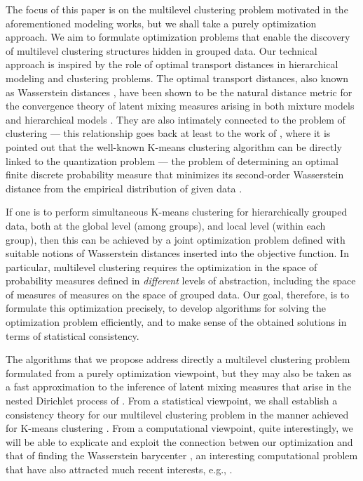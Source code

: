 The focus of this paper is on the multilevel clustering problem motivated in the aforementioned
modeling works, but we shall take a purely optimization approach. 
We aim to formulate optimization problems that enable the discovery of multilevel clustering 
structures hidden in grouped data. Our technical approach is
inspired by the role of optimal transport distances in hierarchical modeling and clustering problems.
The optimal transport distances, also known as Wasserstein distances \citep{Villani-03},
have been shown to be the natural distance metric for the convergence theory of latent
mixing measures arising in both mixture models \citep{Nguyen-13} and hierarchical models \citep{Nguyen-2016}.
They are also intimately connected to the problem of clustering --- this relationship goes
back at least to the work of \citep{Pollard-1982}, where it is pointed out that the well-known 
K-means clustering algorithm can be directly linked to the quantization problem --- the problem
of determining an optimal finite discrete probability measure that minimizes its 
second-order Wasserstein distance from the empirical distribution of given data \citep{Graf-2000}.

If one is to perform simultaneous K-means clustering for hierarchically grouped data, both at the global
level (among groups), and local level (within each group), then this can be achieved by a joint optimization
problem defined with suitable notions of Wasserstein distances inserted into the objective
function. In particular, multilevel clustering requires the optimization in the space of
probability measures defined in \emph{different} levels of abstraction, including the space of
measures of measures on the space of grouped data.
Our goal, therefore, is to formulate this optimization precisely, to develop algorithms
for solving the optimization problem efficiently, and to make sense of the obtained solutions
in terms of statistical consistency. 

The algorithms that we propose address directly a multilevel clustering problem 
formulated from a purely optimization viewpoint, but they may also be taken as a fast approximation to
the inference of latent mixing measures that arise in the nested Dirichlet process of \citep{Rodriguez-etal-08}.
From a statistical viewpoint, we shall establish a consistency theory for our multilevel clustering
problem in the manner achieved for K-means clustering \citep{Pollard-1982}. From a computational viewpoint,
quite interestingly, we will be able to explicate and exploit the connection betwen our optimization
and that of finding the Wasserstein barycenter \citep{Carlier-2011}, an interesting
computational problem that have also attracted much recent interests, e.g., \citep{Cuturi-2014}.

